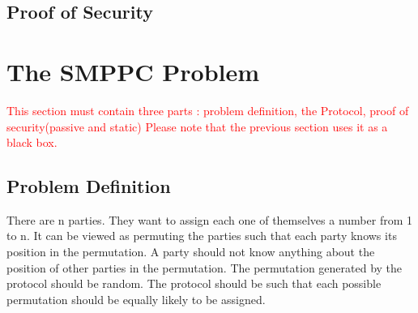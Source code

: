 \documentclass{llncs}
\begin{document}
\subsection{Proof of Security}

\section{The SMPPC Problem}

\textcolor{red}{This section must contain three parts : problem definition, the Protocol, proof of security(passive and static) Please note that the previous section uses it as a black box.  
}
\subsection{Problem Definition}
There are n parties. They want to assign each one of themselves a number from 1 to n. It can be viewed as permuting the parties such that each party knows its position in the permutation. A party should not know anything about the position of other parties in the permutation. The permutation generated by the protocol should be random. The protocol should be such that each possible permutation should be equally likely to be assigned.
\end{document}
